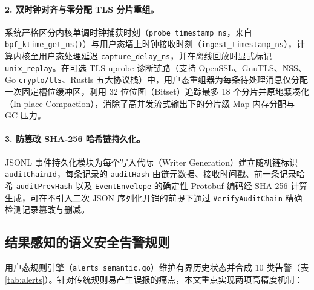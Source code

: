 \documentclass[UTF8,a4paper,zihao=-4,twocolumn]{ctexart}
\newcommand{\code}[1]{\texttt{\small #1}}
\begin{document}
\paragraph{2. 双时钟对齐与零分配 TLS 分片重组。}
系统严格区分内核单调时钟捕获时刻（\code{probe\_timestamp\_ns}，来自 \code{bpf\_ktime\_get\_ns()}）与用户态墙上时钟接收时刻（\code{ingest\_timestamp\_ns}），计算内核至用户态处理延迟 \code{capture\_delay\_ns}，并在离线回放时显式标记 \code{unix\_replay}。在可选 TLS uprobe 诊断链路（支持 OpenSSL、GnuTLS、NSS、Go \code{crypto/tls}、Rustls 五大协议栈）中，用户态重组器为每条待处理消息仅分配一次固定槽位缓冲区，利用 32 位位图（Bitset）追踪最多 18 个分片并原地紧凑化（In-place Compaction），消除了高并发流式输出下的分片级 Map 内存分配与 GC 压力。

\paragraph{3. 防篡改 SHA-256 哈希链持久化。}
JSONL 事件持久化模块为每个写入代际（Writer Generation）建立随机链标识 \code{auditChainId}，每条记录的 \code{auditHash} 由链元数据、接收时间戳、前一条记录哈希 \code{auditPrevHash} 以及 \code{EventEnvelope} 的确定性 Protobuf 编码经 SHA-256 计算生成，可在不引入二次 JSON 序列化开销的前提下通过 \code{VerifyAuditChain} 精确检测记录篡改与删减。

\subsection{结果感知的语义安全告警规则}
用户态规则引擎（\code{alerts\_semantic.go}）维护有界历史状态并合成 10 类告警（表\ref{tab:alerts}）。针对传统规则易产生误报的痛点，本文重点实现两项高精度机制：
\end{document}
